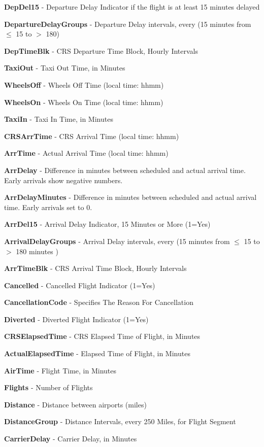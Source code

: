 \documentclass[a4paper,12pt]{article}
\begin{document}
\textbf{DepDel15} - Departure Delay Indicator if the flight is at least 15 minutes delayed

\textbf{DepartureDelayGroups} - Departure Delay intervals, every (15 minutes from $\leq$ 15 to $>$ 180)

\textbf{DepTimeBlk} - CRS Departure Time Block, Hourly Intervals

\textbf{TaxiOut} - Taxi Out Time, in Minutes

\textbf{WheelsOff} - Wheels Off Time (local time: hhmm)

\textbf{WheelsOn} - Wheels On Time (local time: hhmm)

\textbf{TaxiIn} - Taxi In Time, in Minutes

\textbf{CRSArrTime} - CRS Arrival Time (local time: hhmm)

\textbf{ArrTime} - Actual Arrival Time (local time: hhmm)

\textbf{ArrDelay} - Difference in minutes between scheduled and actual arrival time. Early arrivals show negative numbers.

\textbf{ArrDelayMinutes} - Difference in minutes between scheduled and actual arrival time. Early arrivals set to 0.

\textbf{ArrDel15} - Arrival Delay Indicator, 15 Minutes or More (1=Yes)

\textbf{ArrivalDelayGroups} - Arrival Delay intervals, every (15 minutes from $\leq$ 15 to $>$ 180 minutes )

\textbf{ArrTimeBlk} - CRS Arrival Time Block, Hourly Intervals

\textbf{Cancelled} - Cancelled Flight Indicator (1=Yes)

\textbf{CancellationCode} - Specifies The Reason For Cancellation

\textbf{Diverted} - Diverted Flight Indicator (1=Yes)

\textbf{CRSElapsedTime} - CRS Elapsed Time of Flight, in Minutes

\textbf{ActualElapsedTime} - Elapsed Time of Flight, in Minutes

\textbf{AirTime} - Flight Time, in Minutes

\textbf{Flights} - Number of Flights

\textbf{Distance} - Distance between airports (miles)

\textbf{DistanceGroup} - Distance Intervals, every 250 Miles, for Flight Segment

\textbf{CarrierDelay} - Carrier Delay, in Minutes
\end{document}
